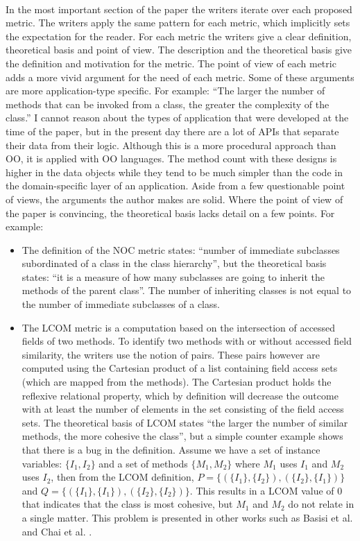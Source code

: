 \paragraph{}
In the most important section of the paper the writers iterate over each proposed metric. The writers apply the
same pattern for each metric, which implicitly sets the expectation for the reader. For each metric the writers give a
clear definition, theoretical basis and point of view. The description and the theoretical basis give the definition and
motivation for the metric. The point of view of each metric adds a more vivid argument for the need of each metric.
Some of these arguments are more application-type specific. For example: ``The larger the number of methods that can be
invoked from a class, the greater the complexity of the class.'' I cannot reason about the types of application that were
developed at the time of the paper, but in the present day there are a lot of APIs that separate their data from their
logic. Although this is a more procedural approach than OO, it is applied with OO languages. The method count
with these designs is higher in the data objects while they tend to be much simpler than the code in the domain-specific
layer of an application. Aside from a few questionable point of views, the arguments the author makes are solid.
Where the point of view of the paper is convincing, the theoretical basis lacks detail on a few points. For example:

\begin{itemize}
\item
The definition of the NOC metric states: ``number of immediate subclasses subordinated of a class in the class
hierarchy'', but the theoretical basis states: ``it is a measure of how many subclasses are going to inherit
the methods of the parent class''. The number of inheriting classes is not equal to the number of immediate subclasses of a
class.
\item
The LCOM metric is a computation based on the intersection of accessed fields of two methods. To identify two
methods with or without accessed field similarity, the writers use the notion of pairs. These pairs however are
computed using the Cartesian product of a list containing field access sets (which are mapped from the
methods). The Cartesian product holds the reflexive relational property, which by definition will decrease
the outcome with at least the number of elements in the set consisting of the field access sets.
The theoretical basis of LCOM states ``the larger the number of similar methods, the more cohesive the class'',
but a simple counter example shows that there is a bug in the definition. Assume we have a set of instance
variables: $\{I_1, I_2\}$ and a set of methods $\{M_1, M_2\}$ where $M_1$ uses $I_1$ and $M_2$ uses $I_2$, then from
the LCOM definition, $P = \{( \{I_1\}, \{I_2\} ), ( \{I_2\}, \{I_1\} ) \}$ and
$Q = \{( \{I_1\}, \{I_1\} ), ( \{I_2\}, \{I_2\} ) \}$. This results in a LCOM value of $0$ that indicates that
the class is most cohesive, but $M_1$ and $M_2$ do not relate in a single matter. This problem is presented in other
works such as Basisi et al. \autocite{BASILI} and Chai et al. \autocite{CHAE}.
\end{itemize}

